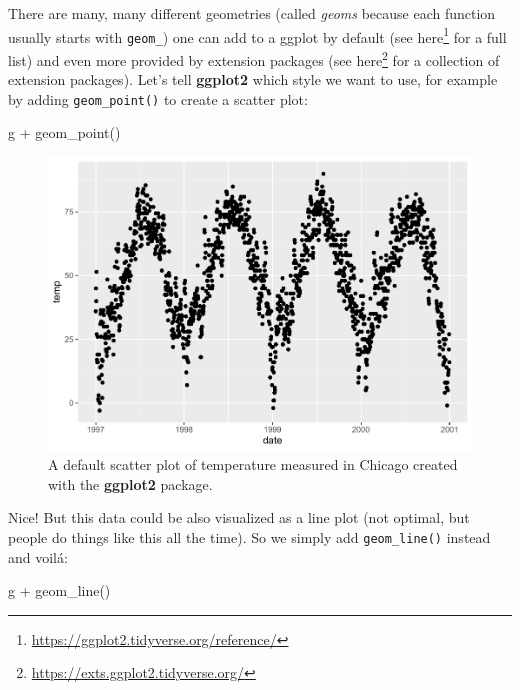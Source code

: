 \documentclass[
]{krantz}
\makeatletter
\newenvironment{Shaded}{\begin{snugshade}}{\end{snugshade}}
\newcommand{\FunctionTok}[1]{\textcolor[rgb]{0,0,0}{#1}}
\newcommand{\NormalTok}[1]{#1}
\newcommand{\SpecialCharTok}[1]{\textcolor[rgb]{0,0,0}{#1}}
\renewcommand{\href}[2]{#2\footnote{\url{#1}}}
\newenvironment{kframe}{%
\medskip{}
\setlength{\fboxsep}{.8em}
 \def\at@end@of@kframe{}%
 \ifinner\ifhmode%
  \def\at@end@of@kframe{\end{minipage}}%
  \begin{minipage}{\columnwidth}%
 \fi\fi%
 \def\FrameCommand##1{\hskip\@totalleftmargin \hskip-\fboxsep
 \colorbox{shadecolor}{##1}\hskip-\fboxsep
     \hskip-\linewidth \hskip-\@totalleftmargin \hskip\columnwidth}%
 \MakeFramed {\advance\hsize-\width
   \@totalleftmargin\z@ \linewidth\hsize
   \@setminipage}}%
 {\par\unskip\endMakeFramed%
 \at@end@of@kframe}
\renewenvironment{Shaded}{\begin{kframe}}{\end{kframe}}
\makeatother
\begin{document}
There are many, many different geometries (called \emph{geoms} because each function usually starts with \texttt{geom\_}) one can add to a ggplot by default (see \href{https://ggplot2.tidyverse.org/reference/}{here} for a full list) and even more provided by extension packages (see \href{https://exts.ggplot2.tidyverse.org/}{here} for a collection of extension packages). Let's tell \textbf{ggplot2} which style we want to use, for example by adding \texttt{geom\_point()} to create a scatter plot:

\begin{Shaded}
\begin{Highlighting}[]
\NormalTok{g }\SpecialCharTok{+} \FunctionTok{geom\_point}\NormalTok{()}
\end{Highlighting}
\end{Shaded}

\begin{figure}
\centering
\includegraphics{bookdown_files/figure-latex/ggplot-default-1.pdf}
\caption{\label{fig:ggplot-default}A default scatter plot of temperature measured in Chicago created with the \textbf{ggplot2} package.}
\end{figure}

Nice! But this data could be also visualized as a line plot (not optimal, but people do things like this all the time). So we simply add \texttt{geom\_line()} instead and voilá:

\begin{Shaded}
\begin{Highlighting}[]
\NormalTok{g }\SpecialCharTok{+} \FunctionTok{geom\_line}\NormalTok{()}
\end{Highlighting}
\end{Shaded}
\end{document}
